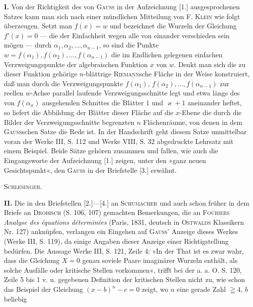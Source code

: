 {\small
\noindent\hspace*{\parindent}\textbf{I.} Von der Richtigkeit des von \textsc{Gauss} in der Aufzeichnung [1.] ausgesprochenen Satzes kann man sich
nach einer mündlichen Mitteilung von F. \textsc{Klein} wie folgt überzeugen. Setzt man $f(x)=w$ und bezeichnet
die Wurzeln der Gleichung $f'(x)=0$ — die der Einfachheit wegen alle von einander verschieden sein mögen —
durch $\alpha_1,\alpha_2,\ldots,\alpha_{n-1}$, so sind die Punkte $w=f(\alpha_1),f(\alpha_2),\ldots,f(\alpha_{n-1})$ die im Endlichen gelegenen einfachen
Verzweigungspunkte der algebraischen Funktion $x$ von $w$. Denkt man sich die zu dieser Funktion gehörige
$n$-blättrige \textsc{Riemann}sche Fläche in der Weise konstruiert, daß man durch die Verzweigungspunkte $f(\alpha_1)$,
$f(\alpha_2),\ldots,f(\alpha_{n-1})$ zur reellen $w$-Achse parallel laufende Verzweigungsschnitte legt und etwa längs des von
$f(\alpha_\varkappa)$ ausgehenden Schnittes die Blätter $1$ und $\varkappa+1$ aneinander heftet, so liefert die Abbildung der Blätter
dieser Fläche auf die $x$-Ebene die durch die Bilder der Verzweigungsschnitte begrenzten $n$ Flächenräume,
von denen in dem \textsc{Gauss}schen Satze die Rede ist. In der Handschrift geht diesem Satze unmittelbar voran
der Werke III, S. 112 und Werke VIII, S. 32 abgedruckte Lehrsatz mit einem Beispiel. Beide Sätze gehören
zusammen und fallen, wie auch die Eingangsworte der Aufzeichnung [1.] zeigen, unter den »ganz
neuen Gesichtspunkt«, den \textsc{Gauss} in der Briefstelle [3.] erwähnt.
\par\hfill\textsc{Schlesinger}.\par\medskip
\noindent\hspace*{\parindent}\textbf{II.} Die in den Briefstellen [2.]—[4.] an \textsc{Schumacher} und auch schon früher in dem Briefe an \textsc{Drobisch}
(S. 106, 107) gemachten Bemerkungen, die an \textsc{Fouriers} \textit{Analyse des équations déterminées} (Paris,
1831, deutsch in \textsc{Ostwalds} Klassikern Nr. 127) anknüpfen, verlangen ein Eingehen auf \textsc{Gauss'} Anzeige dieses
Werkes (Werke III, S. 119), da einige Angaben dieser Anzeige einer Richtigstellung bedürfen. Die Aussage
Werke III, S. 121, Zeile 4: »In der That ist es zwar wahr, dass die Gleichung $X=0$ 
genau soviele Paare imaginärer Wurzeln enthält, als solche Ausfälle oder kritische Stellen vorkommen«,
trifft bei der a. a. O. S. 120, Zeile 5 bis 1 v. u. gegebenen Definition der kritischen Stellen nicht
zu, wie schon das Beispiel der Gleichung $(x-b)^n-c=0$ zeigt, wo $n$ eine gerade Zahl $\geqq4$, $b$ beliebig
}
